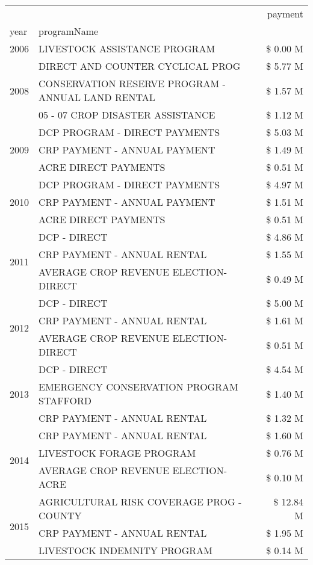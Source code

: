 \begin{tabular}{llr}
\toprule
 &  & payment \\
year & programName &  \\
\midrule
2006 & LIVESTOCK ASSISTANCE PROGRAM & \$ 0.00 M \\
\cline{1-3}
\multirow[t]{3}{*}{2008} & DIRECT AND COUNTER CYCLICAL PROG & \$ 5.77 M \\
 & CONSERVATION RESERVE PROGRAM - ANNUAL LAND RENTAL & \$ 1.57 M \\
 & 05 - 07 CROP DISASTER ASSISTANCE & \$ 1.12 M \\
\cline{1-3}
\multirow[t]{3}{*}{2009} & DCP PROGRAM - DIRECT PAYMENTS & \$ 5.03 M \\
 & CRP PAYMENT - ANNUAL PAYMENT & \$ 1.49 M \\
 & ACRE DIRECT PAYMENTS & \$ 0.51 M \\
\cline{1-3}
\multirow[t]{3}{*}{2010} & DCP PROGRAM - DIRECT PAYMENTS & \$ 4.97 M \\
 & CRP PAYMENT - ANNUAL PAYMENT & \$ 1.51 M \\
 & ACRE DIRECT PAYMENTS & \$ 0.51 M \\
\cline{1-3}
\multirow[t]{3}{*}{2011} & DCP - DIRECT & \$ 4.86 M \\
 & CRP PAYMENT - ANNUAL RENTAL & \$ 1.55 M \\
 & AVERAGE CROP REVENUE ELECTION-DIRECT & \$ 0.49 M \\
\cline{1-3}
\multirow[t]{3}{*}{2012} & DCP - DIRECT & \$ 5.00 M \\
 & CRP PAYMENT - ANNUAL RENTAL & \$ 1.61 M \\
 & AVERAGE CROP REVENUE ELECTION-DIRECT & \$ 0.51 M \\
\cline{1-3}
\multirow[t]{3}{*}{2013} & DCP - DIRECT & \$ 4.54 M \\
 & EMERGENCY CONSERVATION PROGRAM STAFFORD & \$ 1.40 M \\
 & CRP PAYMENT - ANNUAL RENTAL & \$ 1.32 M \\
\cline{1-3}
\multirow[t]{3}{*}{2014} & CRP PAYMENT - ANNUAL RENTAL & \$ 1.60 M \\
 & LIVESTOCK FORAGE PROGRAM & \$ 0.76 M \\
 & AVERAGE CROP REVENUE ELECTION-ACRE & \$ 0.10 M \\
\cline{1-3}
\multirow[t]{3}{*}{2015} & AGRICULTURAL RISK COVERAGE PROG - COUNTY & \$ 12.84 M \\
 & CRP PAYMENT - ANNUAL RENTAL & \$ 1.95 M \\
 & LIVESTOCK INDEMNITY PROGRAM & \$ 0.14 M \\

\end{tabular}
